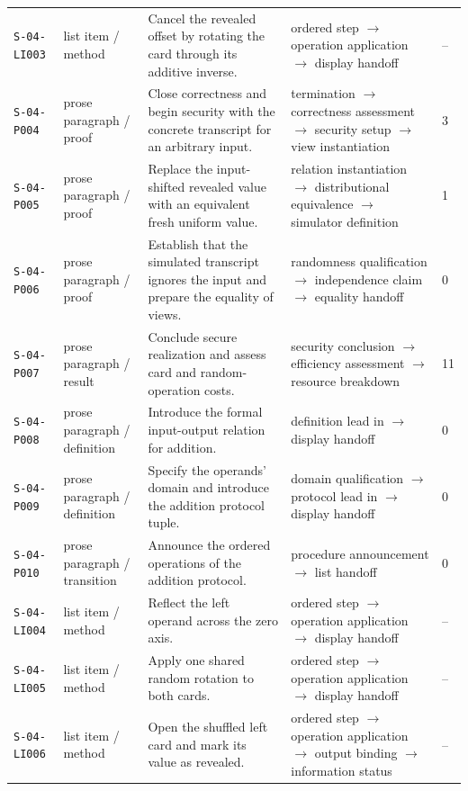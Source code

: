 \documentclass[10pt]{article}
\begin{document}
\begin{longtable}{@{}p{}p{}p{}p{}p{}@{}}
\texttt{S-04-LI003}&list item / method&Cancel the revealed offset by rotating the card through its additive inverse.&ordered step $\rightarrow$ operation application $\rightarrow$ display handoff&--\\
\texttt{S-04-P004}&prose paragraph / proof&Close correctness and begin security with the concrete transcript for an arbitrary input.&termination $\rightarrow$ correctness assessment $\rightarrow$ security setup $\rightarrow$ view instantiation&3\\
\texttt{S-04-P005}&prose paragraph / proof&Replace the input-shifted revealed value with an equivalent fresh uniform value.&relation instantiation $\rightarrow$ distributional equivalence $\rightarrow$ simulator definition&1\\
\texttt{S-04-P006}&prose paragraph / proof&Establish that the simulated transcript ignores the input and prepare the equality of views.&randomness qualification $\rightarrow$ independence claim $\rightarrow$ equality handoff&0\\
\texttt{S-04-P007}&prose paragraph / result&Conclude secure realization and assess card and random-operation costs.&security conclusion $\rightarrow$ efficiency assessment $\rightarrow$ resource breakdown&11\\
\texttt{S-04-P008}&prose paragraph / definition&Introduce the formal input-output relation for addition.&definition lead in $\rightarrow$ display handoff&0\\
\texttt{S-04-P009}&prose paragraph / definition&Specify the operands' domain and introduce the addition protocol tuple.&domain qualification $\rightarrow$ protocol lead in $\rightarrow$ display handoff&0\\
\texttt{S-04-P010}&prose paragraph / transition&Announce the ordered operations of the addition protocol.&procedure announcement $\rightarrow$ list handoff&0\\
\texttt{S-04-LI004}&list item / method&Reflect the left operand across the zero axis.&ordered step $\rightarrow$ operation application $\rightarrow$ display handoff&--\\
\texttt{S-04-LI005}&list item / method&Apply one shared random rotation to both cards.&ordered step $\rightarrow$ operation application $\rightarrow$ display handoff&--\\
\texttt{S-04-LI006}&list item / method&Open the shuffled left card and mark its value as revealed.&ordered step $\rightarrow$ operation application $\rightarrow$ output binding $\rightarrow$ information status&--\\

\end{longtable}
\end{document}
